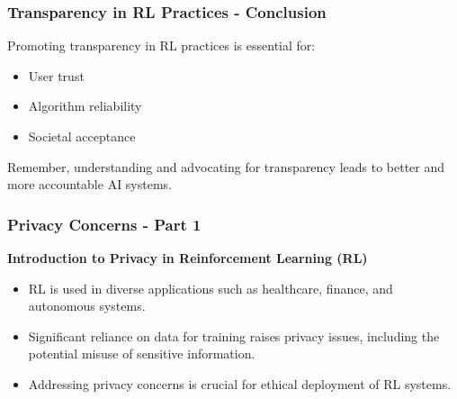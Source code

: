 \documentclass[aspectratio=169]{beamer}
\begin{document}
\begin{frame}[fragile]
    \frametitle{Transparency in RL Practices - Conclusion}
    Promoting transparency in RL practices is essential for:
    \begin{itemize}
        \item User trust
        \item Algorithm reliability
        \item Societal acceptance
    \end{itemize}
    Remember, understanding and advocating for transparency leads to better and more accountable AI systems. 
\end{frame}

\begin{frame}[fragile]
    \frametitle{Privacy Concerns - Part 1}
    \textbf{Introduction to Privacy in Reinforcement Learning (RL)} 
    \begin{itemize}
        \item RL is used in diverse applications such as healthcare, finance, and autonomous systems.
        \item Significant reliance on data for training raises privacy issues, including the potential misuse of sensitive information.
        \item Addressing privacy concerns is crucial for ethical deployment of RL systems.
    \end{itemize}
\end{frame}
\end{document}
